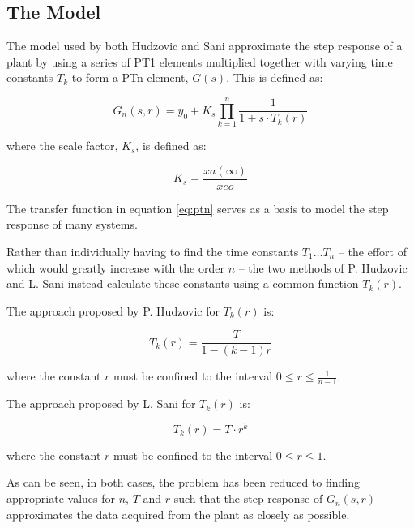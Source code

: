 \subsection{The Model}

The  model  used  by  both  Hudzovic\cite{ref:hudzovic}  and Sani\cite{ref:sani}
approximate  the  step  response of a plant by using a series  of  PT1  elements
multiplied  together with varying time constants $T_k$ to form  a  PTn  element,
$G(s)$. This is defined as:

\begin{equation}
    G_n(s,r) = y_0 + K_s \prod_{k=1}^{n} \frac{1}{1+s \cdot T_k(r)}
    \label{eq:ptn}
\end{equation}

where the scale factor, $K_s$, is defined as:

\begin{equation}
    K_s = \frac{xa(\infty)}{xeo}
\end{equation}

The  transfer function in equation \ref{eq:ptn} serves as a basis to  model  the
step response of many systems.

Rather than individually having to find the time constants  $T_1\ldots  T_n$  --
the effort of which would greatly increase with the order $n$ -- the two methods
of  P.  Hudzovic  and  L.  Sani instead calculate these constants using a common
function $T_k(r)$.

The  approach  proposed  by  P.  Hudzovic\cite{ref:hudzovic}  for  $T_k(r)$  is:

\begin{equation}
    T_k(r) = \frac{T}{1 - (k-1)r}
    \label{eq:hudzovic}
\end{equation}

where  the  constant  $r$ must be  confined  to  the  interval  $0  \le  r  \leq
\frac{1}{n-1}$.

The   approach   proposed   by   L.   Sani\cite{ref:sani}   for   $T_k(r)$   is:

\begin{equation}
    T_k(r) = T \cdot r^k
    \label{eq:sani}
\end{equation}

where the constant $r$ must be confined to the interval $0 \leq r \le 1$.

As  can  be  seen,  in both cases, the  problem  has  been  reduced  to  finding
appropriate values for  $n$,  $T$  and  $r$  such  that  the  step  response  of
$G_n(s,r)$ approximates the data acquired from the plant as closely as possible.

